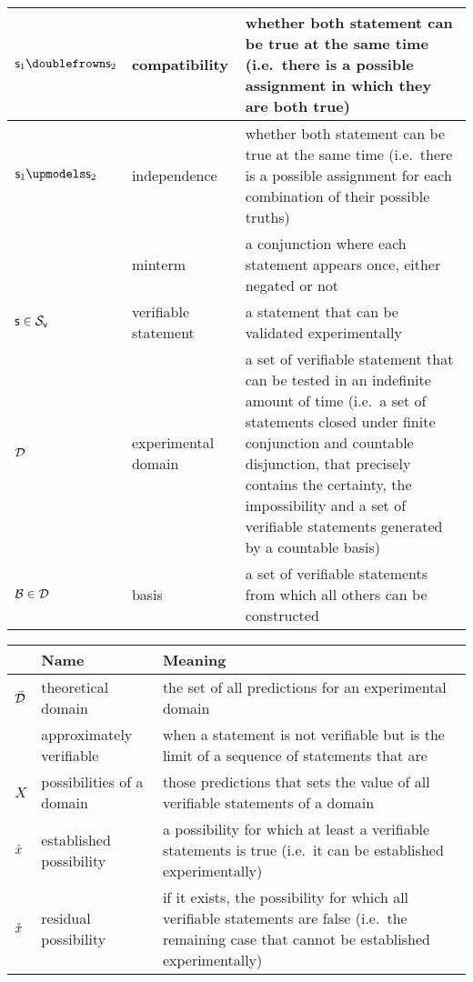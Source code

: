 \documentclass[11pt,letterpaper,fleqn]{memoir} %
\begin{document}
\begin{tabular}{p{} p{} p{}}
	$\stmt_1 \comp \stmt_2$ & compatibility & whether both statement can be true at the same time (i.e.~there is a possible assignment in which they are both true) \\
	\hline 
	$\stmt_1 \indep \stmt_2$ & independence & whether both statement can be true at the same time (i.e.~there is a possible assignment for each combination of their possible truths) \\
	\hline 
	& minterm & a conjunction where each statement appears once, either negated or not \\
	\hline 
	$\mathsf{s} \in \mathcal{S}_\textsf{v}$ & verifiable statement & a statement that can be validated experimentally\\ 
	\hline 
	$\mathcal{D}$ & experimental domain & a set of verifiable statement that can be tested in an indefinite amount of time (i.e.~a set of statements closed under finite conjunction and countable disjunction, that precisely contains the certainty, the impossibility and a set of verifiable statements generated by a countable basis) \\ 
	\hline 
	$\mathcal{B} \in \mathcal{D}$ & basis & a set of verifiable statements from which all others can be constructed\\ 
			
\end{tabular} 

\newpage

\begin{tabular}{p{} p{} p{}}
	& Name & Meaning  \\ 
	\hline 
	$\bar{\mathcal{D}}$ & theoretical domain & the set of all predictions for an experimental domain\\ 
	\hline 
	& approximately verifiable & when a statement is not verifiable but is the limit of a sequence of statements that are\\ 
	\hline 
	$X$ & possibilities of a domain & those predictions that sets the value of all verifiable statements of a domain\\ 
	\hline 
	$\dot{x}$ & established possibility & a possibility for which at least a verifiable statements is true (i.e.~it can be established experimentally)\\ 
	\hline 
	$\mathring{x}$ & residual possibility & if it exists, the possibility for which all verifiable statements are false (i.e.~the remaining case that cannot be established experimentally)\\ 
	
\end{tabular} 
\end{document}
